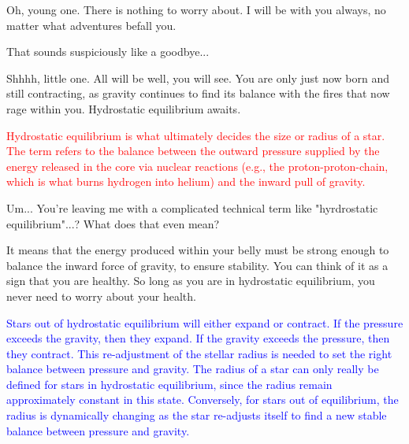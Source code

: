\documentclass[main.tex]{subfiles}
\begin{document}
\par \Pleione Oh, young one.  There is nothing to worry about.  I will be with you always, no matter what adventures befall you.  

\par \Maia That sounds suspiciously like a goodbye...

\par \Pleione Shhhh, little one.  All will be well, you will see.  You are only just now born and still contracting, as gravity continues to find its balance with the fires that now rage within you.  Hydrostatic equilibrium awaits.

\begin{tcolorbox}[sharp corners, colback=red!30, colframe=red!80!blue, title=Hydrostatic Equilibrium]
\par \textcolor{red} {Hydrostatic equilibrium is what ultimately decides the size or radius of a star.  The term refers to the balance between the outward pressure supplied by the energy released in the core via nuclear reactions (e.g., the proton-proton-chain, which is what burns hydrogen into helium) and the inward pull of gravity.}
\end{tcolorbox}

\par \Maia Um... You're leaving me with a complicated technical term like "hyrdrostatic equilibrium"...?  What does that even mean?

\par \Pleione It means that the energy produced within your belly must be strong enough to balance the inward force of gravity, to ensure stability.  You can think of it as a sign that you are healthy.  So long as you are in hydrostatic equilibrium, you never need to worry about your health.

\begin{tcolorbox}[sharp corners, colback=blue!30, colframe=blue!80!blue, title=What determines the radius of a star?]
\par \textcolor{blue} {Stars out of hydrostatic equilibrium will either expand or contract.  If the pressure exceeds the gravity, then they expand.  If the gravity exceeds the pressure, then they contract.  This re-adjustment of the stellar radius is needed to set the right balance between pressure and gravity.  The radius of a star can only really be defined for stars in hydrostatic equilibrium, since the radius remain approximately constant in this state.  Conversely, for stars out of equilibrium, the radius is dynamically changing as the star re-adjusts itself to find a new stable balance between pressure and gravity.}
\end{tcolorbox}
\end{document}
